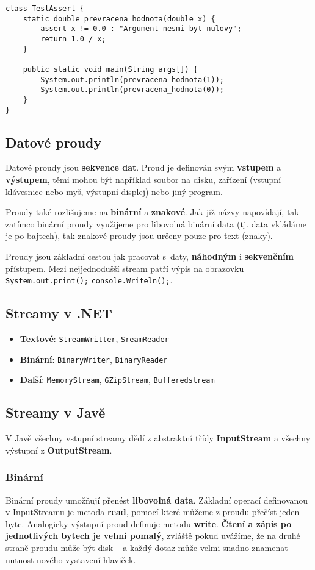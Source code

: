 \begin{verbatim}
class TestAssert { 
	static double prevracena_hodnota(double x) { 
		assert x != 0.0 : "Argument nesmi byt nulovy"; 
		return 1.0 / x; 
	}    
	
	public static void main(String args[]) { 
		System.out.println(prevracena_hodnota(1)); 
		System.out.println(prevracena_hodnota(0)); 
	} 
}
\end{verbatim}

\subsection{Datové proudy}
Datové proudy jsou \textbf{sekvence dat}. Proud je definován svým \textbf{vstupem} a \textbf{výstupem}, těmi mohou být například soubor na disku, zařízení (vstupní klávesnice nebo myš, výstupní displej) nebo jiný program.

Proudy také rozlišujeme na \textbf{binární} a \textbf{znakové}. Jak již názvy napovídají, tak zatímco binární proudy využijeme pro libovolná binární data (tj. data vkládáme je po bajtech), tak znakové proudy jsou určeny pouze pro text (znaky).

Proudy jsou základní cestou jak pracovat s daty, \textbf{náhodným} i \textbf{sekvenčním} přístupem. Mezi nejjednodušší stream patří výpis na obrazovku \texttt{System.out.print();} \texttt{console.Writeln();}.

\subsection{Streamy v .NET}
\begin{itemize}
	\item \textbf{Textové}: \texttt{StreamWritter}, \texttt{SreamReader} 
	\item \textbf{Binární}:	 \texttt{BinaryWriter},	 \texttt{BinaryReader} 
	\item \textbf{Další}:	 \texttt{MemoryStream},	 \texttt{GZipStream},		 \texttt{Bufferedstream} 
\end{itemize}

\subsection{Streamy v Javě}
V Javě všechny vstupní streamy dědí z abstraktní třídy \textbf{InputStream} a všechny výstupní z \textbf{OutputStream}.

\subsubsection{Binární}
Binární proudy umožňují přenést \textbf{libovolná data}. Základní operací definovanou v InputStreamu je metoda \textbf{read}, pomocí které můžeme z proudu přečíst jeden byte. Analogicky výstupní proud definuje metodu \textbf{write}. \textbf{Čtení a zápis po jednotlivých bytech je velmi pomalý}, zvláště pokud uvážíme, že na druhé straně proudu může být disk – a každý dotaz může velmi snadno znamenat nutnost nového vystavení hlaviček.

